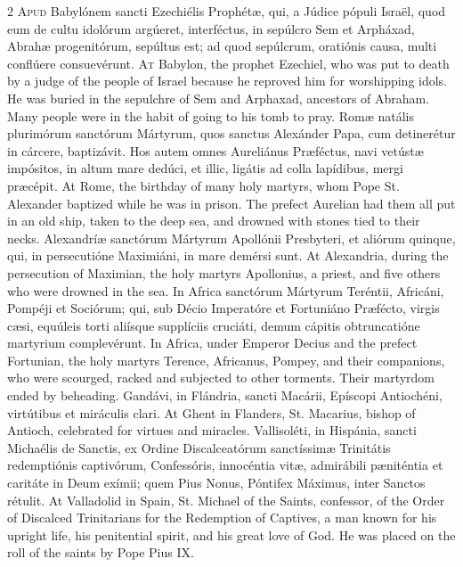\begin{paracol}{2}
\lettrine[lines=2]{A}{pud} Babylónem sancti 
 Ezechiélis Prophétæ, qui, a Júdice pópuli Israël, quod eum de cultu idolórum 
 argúeret, interféctus, in sepúlcro Sem et Arpháxad, Abrahæ progenitórum, 
 sepúltus est; ad quod sepúlcrum, oratiónis causa, multi conflúere 
 consuevérunt.
\switchcolumn
{}
\lettrine[lines=2]{A}{t} Babylon, the prophet Ezechiel, 
 who was put to death by a judge of the people of Israel because he reproved 
 him for worshipping idols. He was buried in the sepulchre of Sem and 
 Arphaxad, ancestors of Abraham. Many people were in the habit of going 
 to his tomb to pray.
\switchcolumn*
{}
Romæ natális 
 plurimórum sanctórum Mártyrum, quos sanctus Alexánder Papa, cum detinerétur 
 in cárcere, baptizávit. Hos autem omnes Aureliánus Præféctus, navi 
 vetústæ impósitos, in altum mare dedúci, et illic, ligátis ad colla 
 lapídibus, mergi præcépit.
\switchcolumn
{}
At Rome, the birthday of many holy 
 martyrs, whom Pope St. Alexander baptized while he was in prison. The 
 prefect Aurelian had them all put in an old ship, taken to the deep sea, and 
 drowned with stones tied to their necks.
\switchcolumn*
{}
Alexandríæ sanctórum 
 Mártyrum Apollónii Presbyteri, et aliórum quinque, qui, in persecutióne 
 Maximiáni, in mare demérsi sunt.
\switchcolumn
{}
At Alexandria, during the 
 persecution of Maximian, the holy martyrs Apollonius, a priest, and five 
 others who were drowned in the sea.
\switchcolumn*
{}
In Africa sanctórum 
 Mártyrum Teréntii, Africáni, Pompéji et Sociórum; qui, sub Décio Imperatóre 
 et Fortuniáno Præfécto, virgis cæsi, equúleis torti aliísque supplíciis 
 cruciáti, demum cápitis obtruncatióne martyrium complevérunt.
\switchcolumn
{}
In Africa, under Emperor Decius and 
 the prefect Fortunian, the holy martyrs Terence, Africanus, Pompey, and 
 their companions, who were scourged, racked and subjected to other torments. 
 Their martyrdom ended by beheading.
\switchcolumn*
{}
Gandávi, in Flándria, 
 sancti Macárii, Epíscopi Antiochéni, virtútibus et miráculis clari.
\switchcolumn
{}
At Ghent in Flanders, St. Macarius, 
 bishop of Antioch, celebrated for virtues and miracles.
\switchcolumn*
{}
Vallisoléti, in 
 Hispánia, sancti Michaélis de Sanctis, ex Ordine Discalceatórum sanctíssimæ 
 Trinitátis redemptiónis captivórum, Confessóris, innocéntia vitæ, admirábili 
 pæniténtia et caritáte in Deum exímii; quem Pius Nonus, Póntifex Máximus, 
 inter Sanctos rétulit.
\switchcolumn
{}
At Valladolid in Spain, St. Michael 
 of the Saints, confessor, of the Order of Discalced Trinitarians for the 
 Redemption of Captives, a man known for his upright life, his penitential 
 spirit, and his great love of God. He was placed on the roll of the 
 saints by Pope Pius IX.
\switchcolumn*
{}
\end{paracol}


